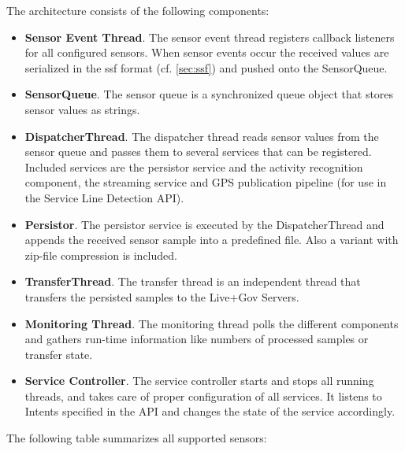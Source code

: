 The architecture consists of the following components:
\begin{itemize}
\item {\bf Sensor Event Thread}. The sensor event thread registers
  callback listeners for all configured sensors. When sensor events
  occur the received values are serialized in the ssf
  format (cf. \ref{sec:ssf}) and pushed onto the SensorQueue.
\item {\bf SensorQueue}. The sensor queue is a synchronized queue
  object that stores sensor values as strings.
\item {\bf DispatcherThread}. The dispatcher thread reads sensor
  values from the sensor queue and passes them to several services
  that can be registered. Included services are the persistor service
  and the activity recognition component, the streaming service and GPS
  publication pipeline (for use in the Service Line Detection API).
\item {\bf Persistor}. The persistor service is executed by the
  DispatcherThread and appends the received sensor sample into a
  predefined file. Also a variant with zip-file compression is
  included.
\item {\bf TransferThread}. The transfer thread is an independent
  thread that transfers the persisted samples to the Live+Gov Servers.
\item {\bf Monitoring Thread}. The monitoring thread polls the
  different components and gathers run-time information like numbers of
  processed samples or transfer state.
\item {\bf Service Controller}. The service controller starts and
  stops all running threads, and takes care of proper configuration of
  all services. It listens to Intents specified in the API and changes
  the state of the service accordingly.
\end{itemize}

The following table summarizes all supported sensors:

